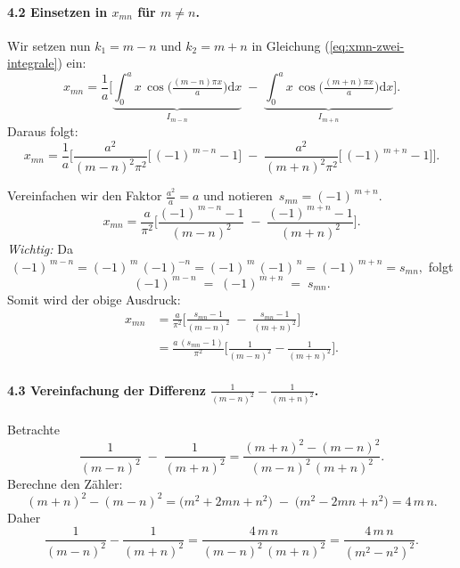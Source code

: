 \documentclass{scrartcl}
\begin{document}
\medskip

\paragraph{4.2 Einsetzen in \(x_{mn}\) für \(m \neq n\).}

Wir setzen nun \(k_1 = m - n\) und \(k_2 = m + n\) in Gleichung (\ref{eq:xmn-zwei-integrale}) ein:
\[
x_{mn}
= \frac{1}{a}\Biggl[
\underbrace{\int_{0}^{a} x\,\cos\!\bigl(\tfrac{(m-n)\pi x}{a}\bigr)\mathrm{d}x}_{I_{m-n}}
\;-\;
\underbrace{\int_{0}^{a} x\,\cos\!\bigl(\tfrac{(m+n)\pi x}{a}\bigr)\mathrm{d}x}_{I_{m+n}}
\Biggr].
\]
Daraus folgt:
\[
x_{mn}
= \frac{1}{a}\Biggl[
\frac{a^{2}}{(m-n)^{2}\pi^{2}}\bigl[\,(-1)^{\,m-n} - 1\bigr]
\;-\;
\frac{a^{2}}{(m+n)^{2}\pi^{2}}\bigl[\,(-1)^{\,m+n} - 1\bigr]
\Biggr].
\]

Vereinfachen wir den Faktor \(\frac{a^{2}}{a} = a\) und notieren 
\(\,s_{mn} = (-1)^{\,m+n}.\)
\[
x_{mn}
= \frac{a}{\pi^{2}}\Biggl[
\frac{(-1)^{\,m-n} - 1}{(m-n)^{2}}
\;-\;
\frac{(-1)^{\,m+n} - 1}{(m+n)^{2}}
\Biggr].
\]
\emph{Wichtig:} Da \(\;(-1)^{\,m-n} = (-1)^{\,m}\,(-1)^{-n} 
= (-1)^{\,m}\,(-1)^{\,n} = (-1)^{\,m+n} = s_{mn},\) folgt
\[
(-1)^{\,m-n} \;=\; (-1)^{\,m+n} \;=\; s_{mn}.
\]
Somit wird der obige Ausdruck:
\begin{align*}
x_{mn}
&= \frac{a}{\pi^{2}}\Biggl[
\frac{s_{mn} - 1}{(m-n)^{2}}
\;-\;
\frac{s_{mn} - 1}{(m+n)^{2}}
\Biggr]\\
&= \frac{a\,(s_{mn} - 1)}{\pi^{2}}
\Biggl[
\frac{1}{(m-n)^{2}} - \frac{1}{(m+n)^{2}}
\Biggr].
\end{align*}

\medskip

\paragraph{4.3 Vereinfachung der Differenz \(\frac{1}{(m-n)^{2}} - \frac{1}{(m+n)^{2}}\).}

Betrachte
\[
\frac{1}{(m-n)^{2}} \;-\; \frac{1}{(m+n)^{2}}
= \frac{(m+n)^{2} - (m-n)^{2}}{(m-n)^{2}\,(m+n)^{2}}.
\]
Berechne den Zähler:
\[
(m+n)^{2} - (m-n)^{2} 
= \bigl(m^{2} + 2mn + n^{2}\bigr) \;-\; \bigl(m^{2} - 2mn + n^{2}\bigr)
= 4\,m\,n.
\]
Daher
\[
\frac{1}{(m-n)^{2}} - \frac{1}{(m+n)^{2}}
= \frac{4\,m\,n}{(m-n)^{2}\,(m+n)^{2}}
= \frac{4\,m\,n}{(m^{2} - n^{2})^{2}}.
\]
\end{document}

